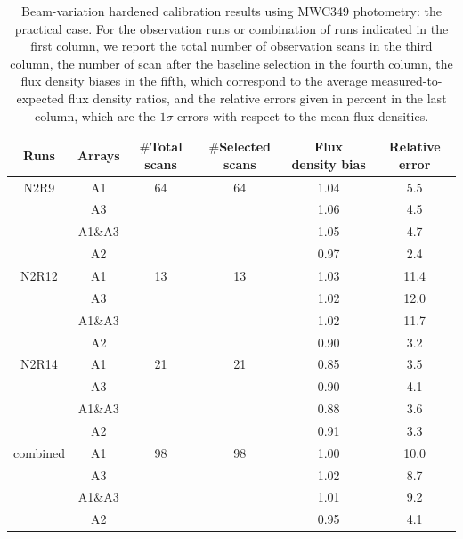 \begin{table}[th]
\begin{center}
\begin{tabular}{|c|c|cccc|}
\hline
Runs & Arrays & $\#$Total scans   & $\#$Selected scans & Flux density bias  & Relative error \\ 
\hline\hline
 N2R9   & A1        & 64                 &  64         & 1.04               &  5.5    \\ 
        & A3        &                    &             & 1.06               &  4.5     \\ 
        & A1$\&$A3  &                    &             & 1.05               &  4.7    \\ 
        & A2        &                    &             & 0.97               &  2.4    \\ 
 \hline
 N2R12  & A1        & 13                 &  13         & 1.03               &  11.4   \\ 
        & A3        &                    &             & 1.02               &  12.0    \\ 
        & A1$\&$A3  &                    &             & 1.02               &  11.7    \\ 
        & A2        &                    &             & 0.90               &   3.2     \\
 \hline
 N2R14  & A1        & 21                 &  21         & 0.85               &  3.5    \\ 
        & A3        &                    &             & 0.90               &  4.1    \\ 
        & A1$\&$A3  &                    &             & 0.88               &  3.6    \\ 
        & A2        &                    &             & 0.91               &  3.3    \\
 \hline
combined & A1        &  98                & 98         &  1.00              &  10.0  \\ 
         & A3        &                    &            &  1.02              &  8.7   \\ 
         & A1$\&$A3  &                    &            &  1.01              &  9.2   \\ 
         & A2        &                    &            &  0.95              &  4.1   \\
\hline\hline
\end{tabular}
\caption[Beam-variation hardened calibration results using MWC349: the
practical case]{Beam-variation hardened calibration results using
  MWC349 photometry: the practical case. For the observation runs or combination of runs indicated in the first column, we report the total number of observation scans in the third column, the number of scan after the baseline selection in the fourth column, the flux density biases in the fifth, which correspond to the average measured-to-expected flux density ratios, and the relative errors given in percent in the last column, which are the $1\sigma$ errors with respect to the mean flux densities.}
\label{tab:photocorr_pointing_calib_result_mwc349}
\end{center}
\end{table}


